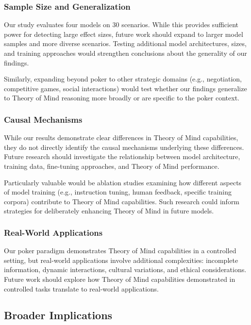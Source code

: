 \subsubsection{Sample Size and Generalization}

Our study evaluates four models on 30 scenarios. While this provides sufficient power for detecting large effect sizes, future work should expand to larger model samples and more diverse scenarios. Testing additional model architectures, sizes, and training approaches would strengthen conclusions about the generality of our findings.

Similarly, expanding beyond poker to other strategic domains (e.g., negotiation, competitive games, social interactions) would test whether our findings generalize to Theory of Mind reasoning more broadly or are specific to the poker context.

\subsubsection{Causal Mechanisms}

While our results demonstrate clear differences in Theory of Mind capabilities, they do not directly identify the causal mechanisms underlying these differences. Future research should investigate the relationship between model architecture, training data, fine-tuning approaches, and Theory of Mind performance.

Particularly valuable would be ablation studies examining how different aspects of model training (e.g., instruction tuning, human feedback, specific training corpora) contribute to Theory of Mind capabilities. Such research could inform strategies for deliberately enhancing Theory of Mind in future models.

\subsubsection{Real-World Applications}

Our poker paradigm demonstrates Theory of Mind capabilities in a controlled setting, but real-world applications involve additional complexities: incomplete information, dynamic interactions, cultural variations, and ethical considerations. Future work should explore how Theory of Mind capabilities demonstrated in controlled tasks translate to real-world applications.

\subsection{Broader Implications}
\label{subsec:broader_implications}

